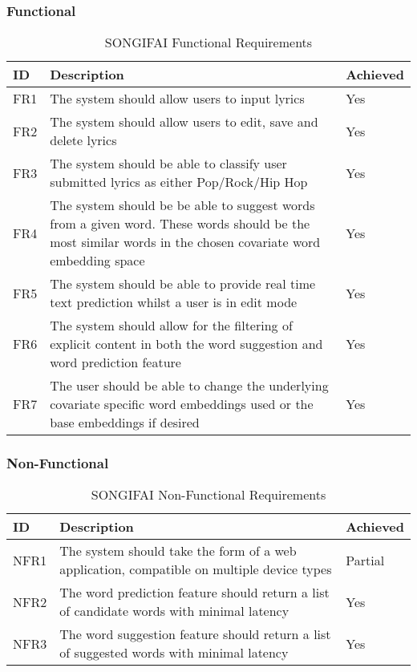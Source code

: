 \subsubsection{Functional}
\begin{table}[h]
	\centering
	\begin{tabular}{ | l | p{10cm} | l | }
		\hline
		\textbf{ID} & \textbf{Description} & \textbf{Achieved} \\ \hline
		FR1 & The system should allow users to input lyrics & Yes \\ \hline
		FR2 & The system should allow users to edit, save and delete lyrics & Yes  \\ \hline
		FR3 & The system should be able to classify user submitted lyrics as either Pop/Rock/Hip Hop & Yes \\ \hline
		FR4 & The system should be be able to suggest words from a given word. These words should be the most similar words in the chosen covariate word embedding space & Yes \\ \hline
		FR5 & The system should be able to provide real time text prediction whilst a user is in edit mode & Yes \\ \hline
		FR6 & The system should allow for the filtering of explicit content in both the word suggestion and word prediction feature & Yes \\ \hline
		FR7 & The user should be able to change the underlying covariate specific word embeddings used or the base embeddings if desired & Yes \\ \hline
	\end{tabular}
	\label{Tab:Tcru}
	\caption[Functional Requirements]{SONGIFAI Functional Requirements}
\end{table}
\subsubsection{Non-Functional}
\begin{table}[ht]
	\centering
	\begin{tabular}{ | l | p{10cm} | l | }
		\hline
		\textbf{ID} & \textbf{Description} & \textbf{Achieved} \\ \hline
		NFR1 & The system should take the form of a web application, compatible on multiple device types & Partial \\ \hline
		NFR2 & The word prediction feature should return a list of candidate words with minimal latency & Yes \\ \hline
		NFR3 & The word suggestion feature should return a list of suggested words with minimal latency & Yes \\ \hline
	\end{tabular}
	\label{Tab:Tcr}
	\caption[Non-Functional Requirements]{SONGIFAI Non-Functional Requirements}
\end{table}
